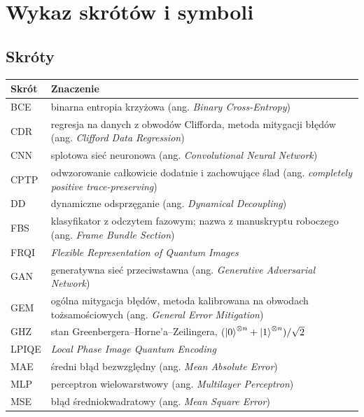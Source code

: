 
\chapter*{Wykaz skrótów i symboli}

\section*{Skróty}

\begin{longtable}{@{}p{}p{}@{}}
\toprule
\textbf{Skrót} & \textbf{Znaczenie} \\
\midrule
\endhead
BCE & binarna entropia krzyżowa (ang. \emph{Binary Cross-Entropy}) \\
CDR & regresja na danych z obwodów Clifforda, metoda mitygacji błędów (ang. \emph{Clifford Data Regression}) \\
CNN & splotowa sieć neuronowa (ang. \emph{Convolutional Neural Network}) \\
CPTP & odwzorowanie całkowicie dodatnie i zachowujące ślad (ang. \emph{completely positive trace-preserving}) \\
DD & dynamiczne odsprzęganie (ang. \emph{Dynamical Decoupling}) \\
FBS & klasyfikator z odczytem fazowym; nazwa z manuskryptu roboczego (ang. \emph{Frame Bundle Section}) \\
FRQI & \emph{Flexible Representation of Quantum Images} \\
GAN & generatywna sieć przeciwstawna (ang. \emph{Generative Adversarial Network}) \\
GEM & ogólna mitygacja błędów, metoda kalibrowana na obwodach tożsamościowych (ang. \emph{General Error Mitigation}) \\
GHZ & stan Greenbergera--Horne'a--Zeilingera, $(\ket{0}^{\otimes n}+\ket{1}^{\otimes n})/\sqrt{2}$ \\
LPIQE & \emph{Local Phase Image Quantum Encoding} \\
MAE & średni błąd bezwzględny (ang. \emph{Mean Absolute Error}) \\
MLP & perceptron wielowarstwowy (ang. \emph{Multilayer Perceptron}) \\
MSE & błąd średniokwadratowy (ang. \emph{Mean Square Error}) \\

\end{longtable}
